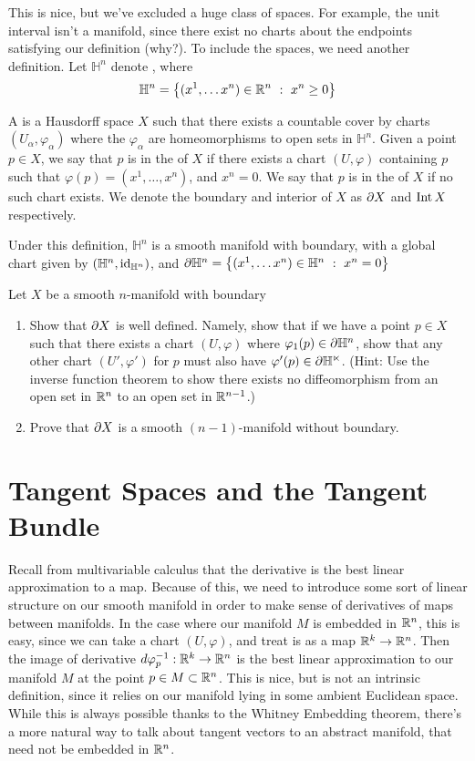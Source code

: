 This is nice, but we've excluded a huge class of spaces. For example, the
unit interval isn't a manifold, since there exist no charts about the
endpoints satisfying our definition (why?). To include the spaces, we
need another definition. Let $\mathbb{H}^n$ denote
, where
$$\mathbb{H}^n = \left\lbrace (x^1, \ldots x^n) \in \mathbb{R}^n ~:~ x^n \geq 0 \right\rbrace $$
%
\begin{defn}
	A  is a Hausdorff space $X$ such that there
	exists a countable cover by charts $(U_\alpha, \varphi_\alpha)$ where
	the $\varphi_\alpha$ are homeomorphisms to open sets in $\mathbb{H}^n$.
	Given a point $p \in X$, we say that $p$ is in the  of
	$X$ if there exists a chart $(U, \varphi)$ containing $p$ such that
	$\varphi(p) = (x^1, \ldots, x^n)$, and $x^n = 0$. We say that $p$ is in
	the  of $X$ if no such chart exists. We denote the boundary
	and interior of $X$ as $\partial X$ and $\operatorname{Int} X$ respectively.
\end{defn}
%
Under this definition, $\mathbb{H}^n$ is a smooth manifold with boundary,
with a global chart given by $(\mathbb{H}^n, \operatorname{id}_{\mathbb{H}^n})$, and
$\partial \mathbb{H}^n = \left\lbrace (x^1, \ldots x^n) \in \mathbb{H}^n ~:~ x^n = 0 \right\rbrace$
%
\begin{exer}
	Let $X$ be a smooth $n$-manifold with boundary
	\begin{enumerate}
		\item Show that $\partial X$ is
		well defined. Namely, show that if we have a point $p \in X$ such that
		there exists a chart $(U, \varphi)$ where $\varphi_1(p) \in \partial
		\mathbb{H}^n$, show that any other chart $(U', \varphi')$ for $p$ must
		also have $\varphi'(p) \in \partial \mathbb{H^n}$. (Hint: Use the inverse
		function theorem to show there exists no diffeomorphism from an open set
		in $\mathbb{R}^n$ to an open set in $\mathbb{R}^{n-1}$.)
		\item Prove that $\partial X$ is a smooth $(n-1)$-manifold without boundary.
	\end{enumerate}
\end{exer}
%
\section{Tangent Spaces and the Tangent Bundle}
%
Recall from multivariable calculus that the derivative is the best linear
approximation to a map. Because of this, we need to introduce some sort
of linear structure on our smooth manifold in order to make sense of
derivatives of maps between manifolds. In the case where our manifold $M$
is embedded in $\mathbb{R}^n$, this is easy, since we can take a chart
$(U, \varphi)$, and treat is as a map $\mathbb{R}^k \to \mathbb{R}^n$. Then
the image of derivative $d\varphi^{-1}_p : \mathbb{R}^k \to \mathbb{R}^n$ is the best
linear approximation to our manifold $M$ at the point $p \in M \subset
\mathbb{R}^n$. This is nice, but is not an intrinsic definition, since it relies
on our  manifold lying in some ambient Euclidean space. While this is
always possible thanks to the Whitney Embedding theorem, there's a more
natural way to talk about tangent vectors to an abstract manifold, that
need not be embedded in $\mathbb{R}^n$. \\

